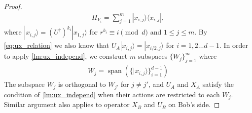 \documentclass[11pt,letterpaper]{article}
\newcommand{\ket}[1]{|#1\rangle}
\newcommand{\ketbra}[2]{|#1\rangle\langle#2|}
\newcommand{\ct}{^{\dagger}}
\DeclareMathOperator{\spn}{span}
\DeclareMathOperator{\supp}{supp}
\newcommand{\1}{\mathbb{1}}
\theoremstyle{definition}
\begin{document}
\begin{proof}
\begin{align}
 \Pi_{V_i} = \sum_{j=1}^m \ketbra{x_{i,j}}{x_{i,j}},
\end{align}
where $\ket{x_{i,j}} = (U\ct)^{k_i} \ket{x_{1,j}}$ for $r^{k_i} \equiv i \pmod{d}$ and $1 \leq j \leq m$.
By \cref{eq:ux_relation} we also know that $U_A \ket{x_{i,j}} = \ket{x_{i/2,j}}$ for $i = 1,2 \dots d-1$.
In order to apply \cref{lm:ux_independ}, we construct $m$ subspaces $\{W_j\}_{j=1}^m$ where 
\begin{align}
	W_j = \spn( \{ \ket{x_{i,j}} \}_{i=1}^{d-1} )
\end{align}
The subspace $W_j$ is orthogonal to $W_{j'}$ for $j \neq j'$, and
$U_A$ and $X_A$ satisfy the condition of \cref{lm:ux_independ} when their actions are 
restricted to each $W_j$.
Similar argument also applies to operator $X_B$ and $U_B$ on Bob's side.




\end{proof}
\end{document}
